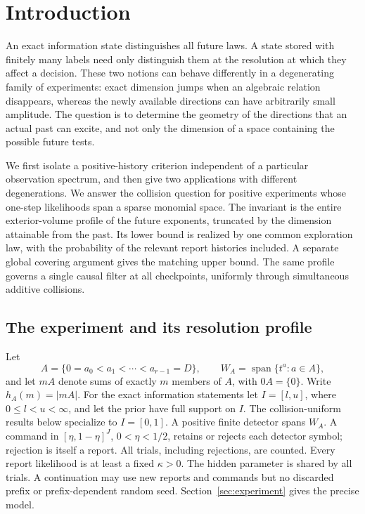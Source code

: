 \section{Introduction}
An exact information state distinguishes all future laws. A state stored
with finitely many labels need only distinguish them at the resolution
at which they affect a decision. These two notions can behave differently
in a degenerating family of experiments: exact dimension jumps when an
algebraic relation disappears, whereas the newly available directions
can have arbitrarily small amplitude. The question is to determine the
geometry of the directions that an actual past can excite, and not only
the dimension of a space containing the possible future tests.

We first isolate a positive-history criterion independent of a particular
observation spectrum, and then give two applications with different
degenerations. We answer the collision question for positive experiments whose one-step
likelihoods span a sparse monomial space. The invariant is the entire
exterior-volume profile of the future exponents, truncated by the
dimension attainable from the past. Its lower bound is realized by one
common exploration law, with the probability of the relevant report
histories included. A separate global covering argument gives the
matching upper bound. The same profile governs a single causal filter
at all checkpoints, uniformly through simultaneous additive collisions.

\subsection{The experiment and its resolution profile}
Let
\[
 A=\{0=a_0<a_1<\cdots<a_{r-1}=D\},\qquad
 W_A=\operatorname{span}\{t^a:a\in A\},
\]
and let $mA$ denote sums of exactly $m$ members of $A$, with $0A=\{0\}$.
Write $h_A(m)=|mA|$. For the exact information statements let
$I=[l,u]$, where $0\le l<u<\infty$, and let the prior have full support
on $I$. The collision-uniform results below specialize to $I=[0,1]$.
A positive finite detector spans $W_A$. A command in
$[\eta,1-\eta]^J$, $0<\eta<1/2$, retains or rejects each detector
symbol; rejection is itself a report. All trials, including rejections,
are counted. Every report likelihood is at least a fixed $\kappa>0$.
The hidden parameter is shared by all trials. A continuation may use
new reports and commands but no discarded prefix or prefix-dependent
random seed. Section~\ref{sec:experiment} gives the precise model.

